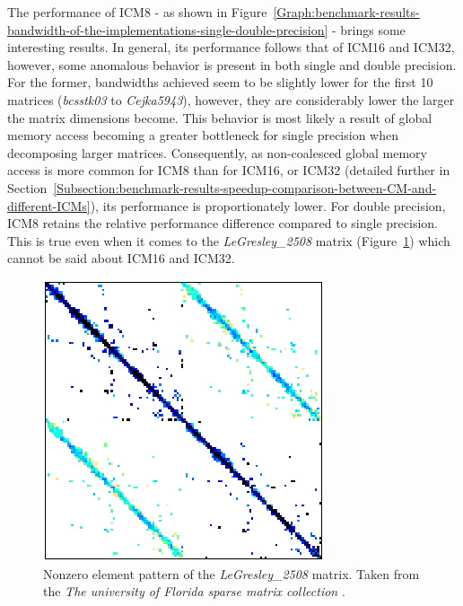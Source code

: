 The performance of ICM8 - as shown in Figure~\ref{Graph:benchmark-results-bandwidth-of-the-implementations-single-double-precision} - brings some interesting results. In general, its performance follows that of ICM16 and ICM32, however, some anomalous behavior is present in both single and double precision. For the former, bandwidths achieved seem to be slightly lower for the first 10 matrices (\textit{bcsstk03} to \textit{Cejka5943}), however, they are considerably lower the larger the matrix dimensions become. This behavior is most likely a result of global memory access becoming a greater bottleneck for single precision when decomposing larger matrices. Consequently, as non-coalesced global memory access is more common for ICM8 than for ICM16, or ICM32 (detailed further in Section~\ref{Subsection:benchmark-results-speedup-comparison-between-CM-and-different-ICMs}), its performance is proportionately lower. For double precision, ICM8 retains the relative performance difference compared to single precision. This is true even when it comes to the \textit{LeGresley\_2508} matrix (Figure~\ref{Figure:benchmark-results-bandwidth-of-the-implementations-matrix-legresley_2508}) which cannot be said about ICM16 and ICM32.

\begin{figure}
	\centering
	\includegraphics[width=.35\textwidth, keepaspectratio, clip]{images/ch3/matrices/legresley_2508.png}
	\caption{Nonzero element pattern of the \mbox{\textit{LeGresley\_2508}} matrix. Taken from the \emph{The university of Florida sparse matrix collection} \cite{Davis2011}.}
	\label{Figure:benchmark-results-bandwidth-of-the-implementations-matrix-legresley_2508}
\end{figure}

